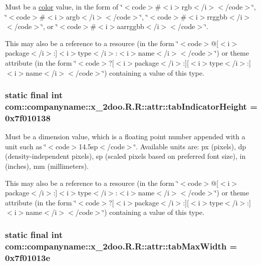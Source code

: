 Must be a \hyperlink{classcom_1_1companyname_1_1x__2doo_1_1_r_1_1color}{color} value, in the form of \char`\"{}$<$code$>$\#$<$i$>$rgb$<$/i$>$$<$/code$>$\char`\"{}, \char`\"{}$<$code$>$\#$<$i$>$argb$<$/i$>$$<$/code$>$\char`\"{}, \char`\"{}$<$code$>$\#$<$i$>$rrggbb$<$/i$>$$<$/code$>$\char`\"{}, or \char`\"{}$<$code$>$\#$<$i$>$aarrggbb$<$/i$>$$<$/code$>$\char`\"{}. 

This may also be a reference to a resource (in the form \char`\"{}$<$code$>$@\mbox{[}$<$i$>$package$<$/i$>$:\mbox{]}$<$i$>$type$<$/i$>$:$<$i$>$name$<$/i$>$$<$/code$>$\char`\"{}) or theme attribute (in the form \char`\"{}$<$code$>$?\mbox{[}$<$i$>$package$<$/i$>$:\mbox{]}\mbox{[}$<$i$>$type$<$/i$>$:\mbox{]}$<$i$>$name$<$/i$>$$<$/code$>$\char`\"{}) containing a value of this type. \hypertarget{classcom_1_1companyname_1_1x__2doo_1_1_r_1_1attr_85ace4563535abbe26f887e8ce5ab7f5}{
\subsubsection[{tabIndicatorHeight}]{\setlength{\rightskip}{0pt plus 5cm}static final int com::companyname::x\_\-2doo.R.R::attr::tabIndicatorHeight = 0x7f010138}}
\label{classcom_1_1companyname_1_1x__2doo_1_1_r_1_1attr_85ace4563535abbe26f887e8ce5ab7f5}


Must be a dimension value, which is a floating point number appended with a unit such as \char`\"{}$<$code$>$14.5sp$<$/code$>$\char`\"{}. Available units are: px (pixels), dp (density-independent pixels), sp (scaled pixels based on preferred font size), in (inches), mm (millimeters). 

This may also be a reference to a resource (in the form \char`\"{}$<$code$>$@\mbox{[}$<$i$>$package$<$/i$>$:\mbox{]}$<$i$>$type$<$/i$>$:$<$i$>$name$<$/i$>$$<$/code$>$\char`\"{}) or theme attribute (in the form \char`\"{}$<$code$>$?\mbox{[}$<$i$>$package$<$/i$>$:\mbox{]}\mbox{[}$<$i$>$type$<$/i$>$:\mbox{]}$<$i$>$name$<$/i$>$$<$/code$>$\char`\"{}) containing a value of this type. \hypertarget{classcom_1_1companyname_1_1x__2doo_1_1_r_1_1attr_59ed64d2fb44e09534446455a797d37b}{
\subsubsection[{tabMaxWidth}]{\setlength{\rightskip}{0pt plus 5cm}static final int com::companyname::x\_\-2doo.R.R::attr::tabMaxWidth = 0x7f01013e}}
\label{classcom_1_1companyname_1_1x__2doo_1_1_r_1_1attr_59ed64d2fb44e09534446455a797d37b}


